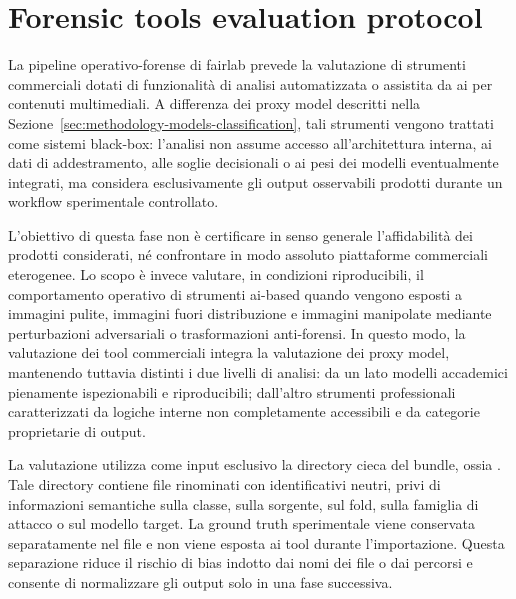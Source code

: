 \section{Forensic tools evaluation protocol}
\label{sec:methodology-forensic-tools}

La pipeline operativo-forense di \gls{fairlab} prevede la valutazione di strumenti commerciali dotati di funzionalità di analisi automatizzata o assistita da \gls{ai} per contenuti multimediali. A differenza dei proxy model descritti nella Sezione~\ref{sec:methodology-models-classification}, tali strumenti vengono trattati come sistemi black-box: l'analisi non assume accesso all'architettura interna, ai dati di addestramento, alle soglie decisionali o ai pesi dei modelli eventualmente integrati, ma considera esclusivamente gli output osservabili prodotti durante un workflow sperimentale controllato.

L'obiettivo di questa fase non è certificare in senso generale l'affidabilità dei prodotti considerati, né confrontare in modo assoluto piattaforme commerciali eterogenee. Lo scopo è invece valutare, in condizioni riproducibili, il comportamento operativo di strumenti \gls{ai}-based quando vengono esposti a immagini pulite, immagini fuori distribuzione e immagini manipolate mediante perturbazioni adversariali o trasformazioni anti-forensi. In questo modo, la valutazione dei tool commerciali integra la valutazione dei proxy model, mantenendo tuttavia distinti i due livelli di analisi: da un lato modelli accademici pienamente ispezionabili e riproducibili; dall'altro strumenti professionali caratterizzati da logiche interne non completamente accessibili e da categorie proprietarie di output.

La valutazione utilizza come input esclusivo la directory cieca del bundle, ossia . Tale directory contiene file rinominati con identificativi neutri, privi di informazioni semantiche sulla classe, sulla sorgente, sul fold, sulla famiglia di attacco o sul modello target. La ground truth sperimentale viene conservata separatamente nel file  e non viene esposta ai tool durante l'importazione. Questa separazione riduce il rischio di bias indotto dai nomi dei file o dai percorsi e consente di normalizzare gli output solo in una fase successiva.

